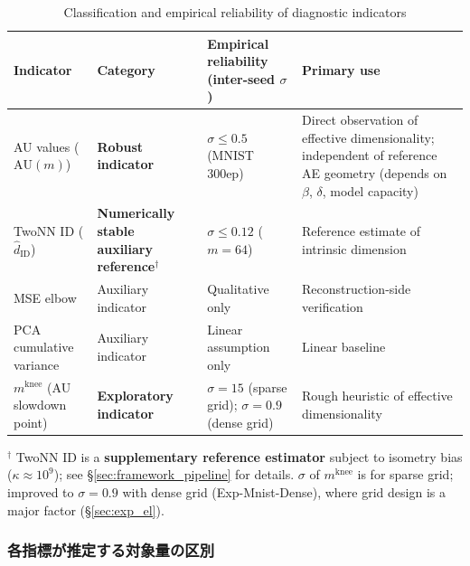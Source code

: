 \documentclass[11pt,a4paper]{jsarticle}
\newcommand{\kap}{\kappa}
\newcommand{\mknee}{m^{\mathrm{knee}}}
\begin{document}
\begin{table}[H]
\centering
\caption{Classification and empirical reliability of diagnostic indicators}
\label{tab:indicator_class}
\small
\begin{tabular}{p{3.3cm}p{3.1cm}p{3.9cm}p{4.0cm}}
\toprule
Indicator & Category & Empirical reliability (inter-seed $\sigma$) & Primary use \\
\midrule
AU values ($\mathrm{AU}(m)$) & \textbf{Robust indicator} & $\sigma \leq 0.5$ (MNIST 300ep) & Direct observation of effective dimensionality; independent of reference AE geometry (depends on $\beta$, $\delta$, model capacity) \\
TwoNN ID ($\hat{d}_\mathrm{ID}$) & \textbf{Numerically stable auxiliary reference}$^\dagger$ & $\sigma \leq 0.12$ ($m=64$) & Reference estimate of intrinsic dimension \\
MSE elbow & Auxiliary indicator & Qualitative only & Reconstruction-side verification \\
PCA cumulative variance & Auxiliary indicator & Linear assumption only & Linear baseline \\
$\mknee$ (AU slowdown point) & \textbf{Exploratory indicator} & $\sigma=15$ (sparse grid); $\sigma=0.9$ (dense grid) & Rough heuristic of effective dimensionality \\
\bottomrule
\end{tabular}
\medskip
\footnotesize
$^\dagger$ TwoNN ID is a \textbf{supplementary reference estimator} subject to isometry bias ($\kap \approx 10^9$); see §\ref{sec:framework_pipeline} for details.
$\sigma$ of $\mknee$ is for sparse grid; improved to $\sigma=0.9$ with dense grid (Exp-Mnist-Dense), where grid design is a major factor (§\ref{sec:exp_el}).
\normalsize
\end{table}

\subsubsection*{各指標が推定する対象量の区別}\label{sec:framework_targets}
\end{document}
